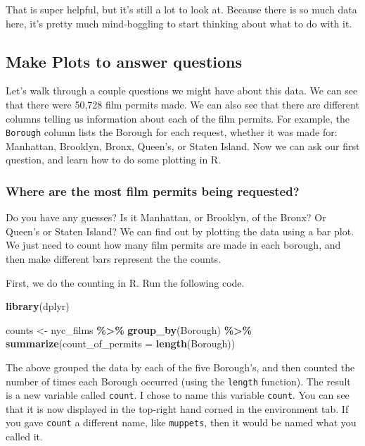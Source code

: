\documentclass[
]{book}
\newenvironment{Shaded}{\begin{snugshade}}{\end{snugshade}}
\newcommand{\AttributeTok}[1]{\textcolor[rgb]{0.13,0.29,0.53}{#1}}
\newcommand{\FunctionTok}[1]{\textcolor[rgb]{0.13,0.29,0.53}{\textbf{#1}}}
\newcommand{\NormalTok}[1]{#1}
\newcommand{\OtherTok}[1]{\textcolor[rgb]{0.56,0.35,0.01}{#1}}
\newcommand{\SpecialCharTok}[1]{\textcolor[rgb]{0.81,0.36,0.00}{\textbf{#1}}}
\begin{document}
That is super helpful, but it's still a lot to look at. Because there is so much data here, it's pretty much mind-boggling to start thinking about what to do with it.

\hypertarget{make-plots-to-answer-questions}{%
\subsection{Make Plots to answer questions}\label{make-plots-to-answer-questions}}

Let's walk through a couple questions we might have about this data. We can see that there were 50,728 film permits made. We can also see that there are different columns telling us information about each of the film permits. For example, the \texttt{Borough} column lists the Borough for each request, whether it was made for: Manhattan, Brooklyn, Bronx, Queen's, or Staten Island. Now we can ask our first question, and learn how to do some plotting in R.

\hypertarget{where-are-the-most-film-permits-being-requested}{%
\subsubsection{Where are the most film permits being requested?}\label{where-are-the-most-film-permits-being-requested}}

Do you have any guesses? Is it Manhattan, or Brooklyn, of the Bronx? Or Queen's or Staten Island? We can find out by plotting the data using a bar plot. We just need to count how many film permits are made in each borough, and then make different bars represent the the counts.

First, we do the counting in R. Run the following code.

\begin{Shaded}
\begin{Highlighting}[]
\FunctionTok{library}\NormalTok{(dplyr)}

\NormalTok{counts }\OtherTok{\textless{}{-}}\NormalTok{ nyc\_films }\SpecialCharTok{\%\textgreater{}\%}
          \FunctionTok{group\_by}\NormalTok{(Borough) }\SpecialCharTok{\%\textgreater{}\%}
          \FunctionTok{summarize}\NormalTok{(}\AttributeTok{count\_of\_permits =} \FunctionTok{length}\NormalTok{(Borough))}
\end{Highlighting}
\end{Shaded}

The above grouped the data by each of the five Borough's, and then counted the number of times each Borough occurred (using the \texttt{length} function). The result is a new variable called \texttt{count}. I chose to name this variable \texttt{count}. You can see that it is now displayed in the top-right hand corned in the environment tab. If you gave \texttt{count} a different name, like \texttt{muppets}, then it would be named what you called it.
\end{document}
